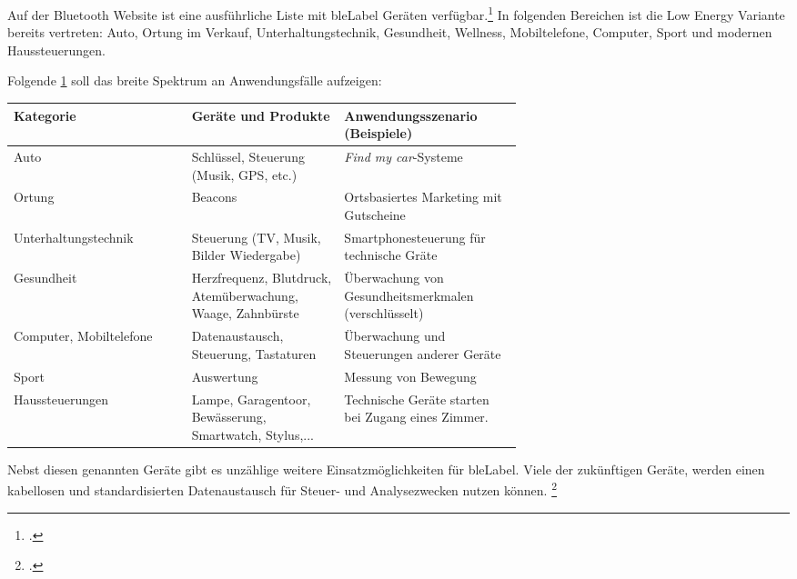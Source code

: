 Auf der Bluetooth Website ist eine ausführliche Liste mit \gls{bleLabel} Geräten verfügbar.\footcite{Bluetooth_Smart_Devices_List_Bluetooth_Technology_Website_2015-05-14}
In folgenden Bereichen ist die Low Energy Variante bereits vertreten: Auto, Ortung im Verkauf, Unterhaltungstechnik, Gesundheit, Wellness, Mobiltelefone, Computer, Sport und modernen Haussteuerungen.

Folgende \cref{tab:usecases} soll das breite Spektrum an Anwendungsfälle aufzeigen:
\begin{table}[H]
	\small\sffamily\renewcommand{\arraystretch}{1.4}
	\label{tab:usecases}
	\begin{tabular}{lp{0.3\linewidth}p{0.35\linewidth}}
		\toprule
		Kategorie & Geräte und Produkte & Anwendungsszenario (Beispiele)\\
		\midrule
		Auto & Schlüssel, Steuerung (Musik, GPS, etc.) & \textit{Find my car}-Systeme\\
		Ortung & Beacons & Ortsbasiertes Marketing mit Gutscheine\\
		Unterhaltungstechnik & Steuerung (TV, Musik, Bilder Wiedergabe) & Smartphonesteuerung für technische Gräte\\
		Gesundheit & Herzfrequenz, Blutdruck, Atemüberwachung, Waage, Zahnbürste & Überwachung von Gesundheitsmerkmalen (verschlüsselt)\\
		Computer, Mobiltelefone & Datenaustausch, Steuerung, Tastaturen & Überwachung und Steuerungen anderer Geräte\\
		Sport & Auswertung & Messung von Bewegung\\
		Haussteuerungen & Lampe, Garagentoor, Bewässerung, Smartwatch, Stylus,... & Technische Geräte starten bei Zugang eines Zimmer.\\
		\bottomrule
	\end{tabular}
\end{table}

Nebst diesen genannten Geräte gibt es unzählige weitere Einsatzmöglichkeiten für \gls{bleLabel}.
Viele der zukünftigen Geräte, werden einen kabellosen und standardisierten Datenaustausch für Steuer- und Analysezwecken nutzen können.
\footcite[][3,5]{ti_whitepaper_2015-05-08}





